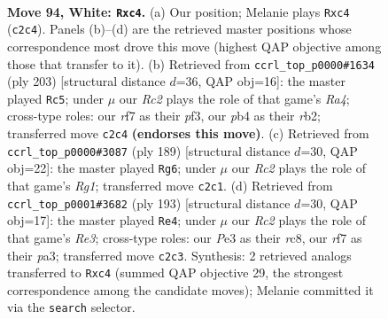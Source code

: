 \documentclass[11pt]{article}
\begin{document}
\clearpage

\begin{figure}[p]\centering
\begin{subfigure}{0.46\textwidth}\centering
\resizebox{\linewidth}{!}{%
\newchessgame
\chessboard[
  setfen={8/5r2/p2k4/P1p2p1p/1pp2P1P/4P1P1/1PR3K1/8 w - - 8 94},
  showmover=false,
  pgfstyle=straightmove, color=movearrow, markmove={c2-c4}
]}
\caption{}
\end{subfigure}\hfill
\begin{subfigure}{0.46\textwidth}\centering
\resizebox{\linewidth}{!}{%
\newchessgame
\chessboard[
  setfen={8/2p5/3p2pk/r2Pp1p1/2P1P3/5P1P/1R3K2/8 b - - 22 102},
  showmover=false,
  pgfstyle=straightmove, color=movearrow, markmove={a5-c5}
]}
\caption{}
\end{subfigure}
\\[4pt]
\begin{subfigure}{0.46\textwidth}\centering
\resizebox{\linewidth}{!}{%
\newchessgame
\chessboard[
  setfen={4k1r1/4p3/p2pP3/P4p1p/1pP4P/4KPP1/1R6/8 b - - 0 95},
  showmover=false,
  pgfstyle=straightmove, color=movearrow, markmove={g8-g6}
]}
\caption{}
\end{subfigure}\hfill
\begin{subfigure}{0.46\textwidth}\centering
\resizebox{\linewidth}{!}{%
\newchessgame
\chessboard[
  setfen={2R5/8/1p1kr1p1/p2p1p1p/5P1P/PP1KP1P1/8/8 b - - 16 97},
  showmover=false,
  pgfstyle=straightmove, color=movearrow, markmove={e6-e4}
]}
\caption{}
\end{subfigure}
\caption{\textbf{Move 94, White: \texttt{Rxc4}.} (a) Our position; Melanie plays \texttt{Rxc4} (\texttt{c2c4}). Panels (b)--(d) are the retrieved master positions whose correspondence most drove this move (highest QAP objective among those that transfer to it). (b) Retrieved from \texttt{ccrl\_top\_p0000\#1634} (ply 203) [structural distance $d$=36, QAP obj=16]: the master played \texttt{Rc5}; under $\mu$ our \emph{Rc2} plays the role of that game's \emph{Ra4}; cross-type roles: our \emph{r}f7 as their \emph{p}f3, our \emph{p}b4 as their \emph{r}b2; transferred move \texttt{c2c4} \textbf{(endorses this move)}. (c) Retrieved from \texttt{ccrl\_top\_p0000\#3087} (ply 189) [structural distance $d$=30, QAP obj=22]: the master played \texttt{Rg6}; under $\mu$ our \emph{Rc2} plays the role of that game's \emph{Rg1}; transferred move \texttt{c2c1}. (d) Retrieved from \texttt{ccrl\_top\_p0001\#3682} (ply 193) [structural distance $d$=30, QAP obj=17]: the master played \texttt{Re4}; under $\mu$ our \emph{Rc2} plays the role of that game's \emph{Re3}; cross-type roles: our \emph{P}e3 as their \emph{r}c8, our \emph{r}f7 as their \emph{p}a3; transferred move \texttt{c2c3}. Synthesis: 2 retrieved analogs transferred to \texttt{Rxc4} (summed QAP objective 29, the strongest correspondence among the candidate moves); Melanie committed it via the \texttt{search} selector.}
\label{fig:thought-m186}
\end{figure}
\end{document}

